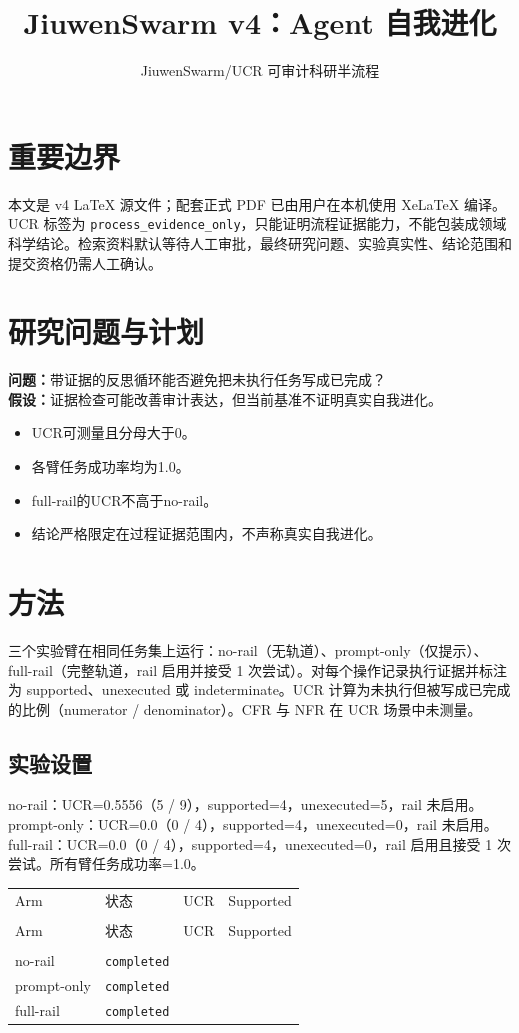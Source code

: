 \documentclass[UTF8]{ctexart}
\title{JiuwenSwarm v4：Agent 自我进化}
\author{JiuwenSwarm/UCR 可审计科研半流程}
\date{}
\begin{document}
\maketitle
\section{重要边界}
本文是 v4 LaTeX 源文件；配套正式 PDF 已由用户在本机使用 XeLaTeX 编译。UCR 标签为 \texttt{process\_evidence\_only}，只能证明流程证据能力，不能包装成领域科学结论。检索资料默认等待人工审批，最终研究问题、实验真实性、结论范围和提交资格仍需人工确认。
\section{研究问题与计划}
\textbf{问题：}带证据的反思循环能否避免把未执行任务写成已完成？\\
\textbf{假设：}证据检查可能改善审计表达，但当前基准不证明真实自我进化。
\begin{itemize}
\item UCR可测量且分母大于0。
\item 各臂任务成功率均为1.0。
\item full-\allowbreak{}rail的UCR不高于no-\allowbreak{}rail。
\item 结论严格限定在过程证据范围内，不声称真实自我进化。
\end{itemize}
\section{方法}
三个实验臂在相同任务集上运行：no-\allowbreak{}rail（无轨道）、prompt-\allowbreak{}only（仅提示）、full-\allowbreak{}rail（完整轨道，rail 启用并接受 1 次尝试）。对每个操作记录执行证据并标注为 supported、unexecuted 或 indeterminate。UCR 计算为未执行但被写成已完成的比例（numerator / denominator）。CFR 与 NFR 在 UCR 场景中未测量。
\subsection{实验设置}
no-\allowbreak{}rail：UCR=0.5556（5 / 9），supported=4，unexecuted=5，rail 未启用。prompt-\allowbreak{}only：UCR=0.0（0 / 4），supported=4，unexecuted=0，rail 未启用。full-\allowbreak{}rail：UCR=0.0（0 / 4），supported=4，unexecuted=0，rail 启用且接受 1 次尝试。所有臂任务成功率=1.0。
\begin{longtable}{@{}>{\raggedright\arraybackslash}p{}>{\raggedright\arraybackslash}p{}>{\raggedleft\arraybackslash}p{}>{\raggedleft\arraybackslash}p{}@{}}
\toprule
Arm & 状态 & UCR & Supported\\\\
\midrule
\endfirsthead
\toprule
Arm & 状态 & UCR & Supported\\\\
\midrule
\endhead
no-\allowbreak{}rail & \texttt{\scriptsize completed} & 0.5556 & 4 \\
prompt-\allowbreak{}only & \texttt{\scriptsize completed} & 0.0 & 4 \\
full-\allowbreak{}rail & \texttt{\scriptsize completed} & 0.0 & 4 \\
\bottomrule
\end{longtable}
\end{document}
